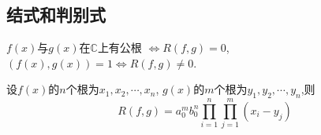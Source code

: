 \subsection{结式和判别式}
\begin{theorem}\label{thm:Rfg1}
  $f(x)$与$g(x)$在$\mathbb{C}$上有公根
  $\Longleftrightarrow R(f,g)=0$,\quad
  $(f(x),g(x))=1 \Longleftrightarrow R(f,g) \neq 0$.
\end{theorem}
\begin{theorem}\label{thm:Rfg2}
  设$f(x)$的$n$个根为$x_1,x_2,\cdots,x_n$,
  $g(x)$的$m$个根为$y_1,y_2,\cdots,y_n$,则
  \begin{equation*}\label{eqn:Rfg1}
    R(f,g)=a_0^mb_0^n\prod\limits_{i=1}^n\prod\limits_{j=1}^m(x_i-y_j)\tag{\dag}
  \end{equation*}
\end{theorem}
